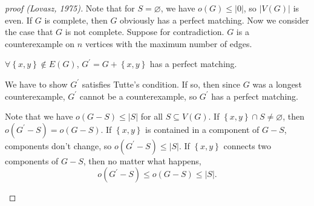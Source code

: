 \begin{proof}[proof (Lovasz, 1975)]
    Note that for \(S = \varnothing\), we have \(o(G) \le \vert 0 \vert \), so \(\vert V(G) \vert \) is even. If \(G\) is complete, then \(G\) obviously has a perfect matching. Now we consider the case that \(G\) is not complete. Suppose for contradiction. \(G\) is a counterexample on \(n\) vertices with the maximum number of edges.      
    \begin{claim}
        \(\forall \left\{ x, y \right\} \notin E(G) \), \(G^{\prime} = G + \left\{ x, y \right\} \) has a perfect matching.  
    \end{claim} 
    \begin{explanation}
        We have to show \(G^{\prime} \) satisfies Tutte's condition. If so, then since \(G\) was a longest counterexample, \(G^{\prime} \) cannot be a counterexample, so \(G^{\prime} \) has a perfect matching. 

        Note that we have \(o(G - S) \le \vert S \vert \) for all \(S \subseteq V(G)\). If \(\left\{ x, y \right\} \cap S \neq \varnothing \), then \(o(G^{\prime} - S) = o(G - S)\). If \(\left\{ x, y \right\} \) is contained in a component of \(G - S\), components don't change, so \(o(G^{\prime} - S) \le \vert S \vert \). If \(\left\{ x, y \right\} \) connects two components of \(G - S\), then no matter what happens, 
        \[
            o(G^{\prime} - S) \le o(G - S) \le \vert S \vert. 
        \]  
    \end{explanation} 


\end{proof}
